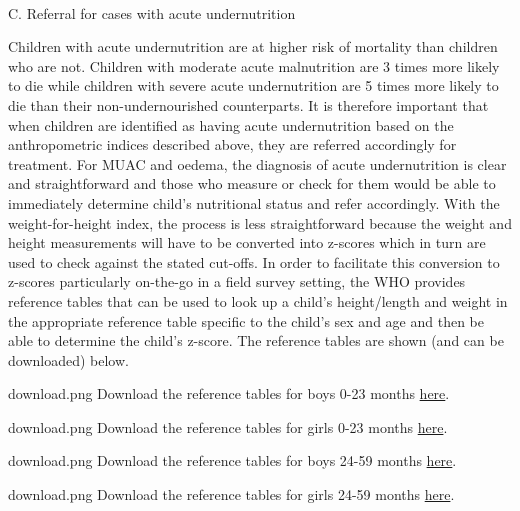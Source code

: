 \documentclass[
  12pt,
]{book}
\newenvironment{rmddownload}
  {\begin{tcolorbox}[width=\textwidth, 
                     colback = {white}, 
                     title = {\textbf{Download}}, 
                     colbacktitle = lightgray,
                     coltitle = black]
  \begin{includegraphics}[scale = 1]{download.png}}
  {\end{includegraphics}
  \end{tcolorbox}}
\begin{document}
~

C. Referral for cases with acute undernutrition

Children with acute undernutrition are at higher risk of mortality than children who are not. Children with moderate acute malnutrition are 3 times more likely to die while children with severe acute undernutrition are 5 times more likely to die than their non-undernourished counterparts. It is therefore important that when children are identified as having acute undernutrition based on the anthropometric indices described above, they are referred accordingly for treatment. For MUAC and oedema, the diagnosis of acute undernutrition is clear and straightforward and those who measure or check for them would be able to immediately determine child's nutritional status and refer accordingly. With the weight-for-height index, the process is less straightforward because the weight and height measurements will have to be converted into z-scores which in turn are used to check against the stated cut-offs. In order to facilitate this conversion to z-scores particularly on-the-go in a field survey setting, the WHO provides reference tables that can be used to look up a child's height/length and weight in the appropriate reference table specific to the child's sex and age and then be able to determine the child's z-score. The reference tables are shown (and can be downloaded) below.

\begin{rmddownload}
Download the reference tables for boys 0-23 months \href{\%22pdf/boys_0_24.pdf\%22}{here}.
\end{rmddownload}

\begin{rmddownload}
Download the reference tables for girls 0-23 months \href{\%22pdf/girls_0_24.pdf\%22}{here}.
\end{rmddownload}

\begin{rmddownload}
Download the reference tables for boys 24-59 months \href{\%22pdf/boys_24_60.pdf\%22}{here}.
\end{rmddownload}

\begin{rmddownload}
Download the reference tables for girls 24-59 months \href{\%22pdf/girls_24_60.pdf\%22}{here}.
\end{rmddownload}

\newpage
\end{document}
